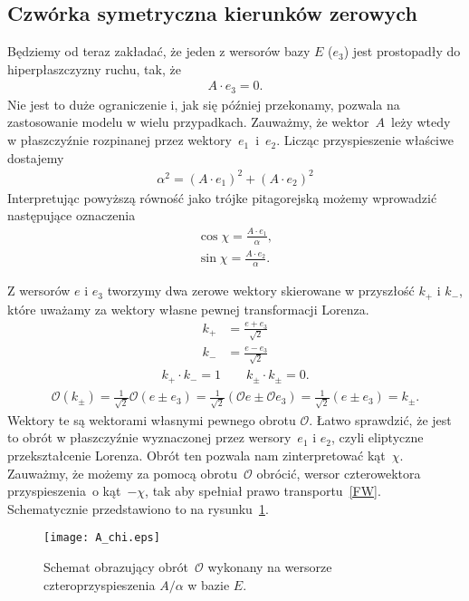 \subsection{Czwórka symetryczna kierunków zerowych}
Będziemy od teraz zakładać, że jeden z wersorów bazy $E$ 
($e_3$) jest prostopadły do hiperpłaszczyzny ruchu, tak, że
\begin{align*}
A\cdot e_3 = 0.
\end{align*}
Nie jest to duże ograniczenie i, jak się później przekonamy, pozwala 
na zastosowanie modelu w wielu przypadkach.
Zauważmy, że wektor~$A$~leży wtedy w płaszczyźnie rozpinanej przez 
wektory~$e_1$~i~$e_2$. Licząc przyspieszenie właściwe dostajemy
\begin{align*}
\alpha^2 = (A\cdot e_1)^2 + (A\cdot e_2)^2
\end{align*}
Interpretując powyższą równość jako trójke pitagorejską 
możemy wprowadzić następujące oznaczenia
\begin{align*}
\cos\chi = \frac{A\cdot e_1}{\alpha},\\
\sin\chi = \frac{A\cdot e_2}{\alpha}.
\end{align*}

Z wersorów $e$ i $e_3$ tworzymy dwa zerowe wektory skierowane 
w przyszłość $k_+$ i $k_-$, 
które uważamy za wektory własne pewnej transformacji Lorenza. 
\begin{align}
k_+ &= \frac{e+e_3}{\sqrt{2}} \\
k_- &= \frac{e-e_3}{\sqrt{2}} 
\end{align}
\begin{align*}
k_+\cdot k_- = 1 \qquad k_\pm\cdot k_\pm  = 0.
\end{align*}
\begin{align*}
\mathcal{O}( k_\pm ) = \frac{1}{\sqrt{2}} \mathcal{O} 
(e\pm e_3) =\frac{1}{\sqrt{2}} 
(\mathcal{O} e\pm \mathcal{O} e_3) =
\frac{1}{\sqrt{2}}  (e\pm e_3) = k_\pm.
\end{align*}
Wektory te są wektorami własnymi pewnego obrotu $\mathcal{O}$.
 Łatwo sprawdzić, że 
jest to obrót w płaszczyźnie wyznaczonej przez wersory~$e_1$ i $e_2$,
czyli eliptyczne przekształcenie Lorenza. 
Obrót ten pozwala nam zinterpretować kąt~$\chi$. 
Zauważmy, że możemy za pomocą obrotu~$\mathcal{O}$ obrócić, 
wersor czterowektora przyspieszenia~o kąt~$-\chi$, 
tak aby spełniał prawo transportu~\eqref{FW}. 
Schematycznie przedstawiono to na rysunku~\ref{A_chi_plot}.
\begin{figure}
\centering
\texttt{[image: A\_chi.eps]}
\caption{Schemat obrazujący obrót~$\mathcal{O}$ wykonany na wersorze 
czteroprzyspieszenia $A/\alpha$ w bazie $E$.}{\label{A_chi_plot}}
\end{figure}

